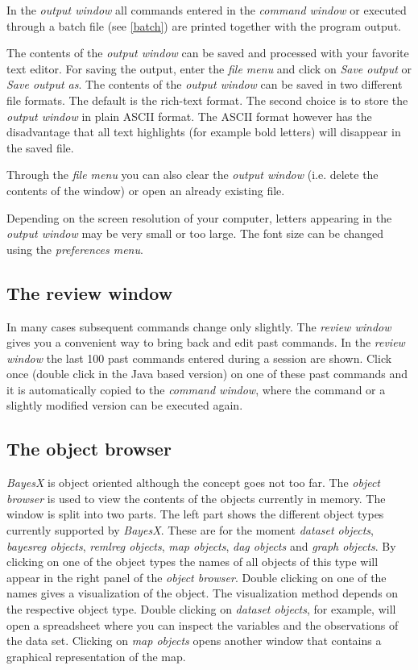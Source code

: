 In the {\em output window} all commands entered in the {\em
command window} or executed through a batch file (see
\autoref{batch}) are printed together with the program output.

 The contents of the {\em output window} can be
saved and processed with your favorite text editor. For saving the
output, enter the {\em file menu} and click on {\em Save output}
or {\em Save output as}. The contents of the {\em output window} can be
saved in two different file formats. The default is the rich-text
format. The second choice is to store the {\em output window} in plain
ASCII format. The ASCII format however has the disadvantage that
all text highlights (for example bold letters) will disappear in
the saved file.

Through the {\em file menu} you can also clear the {\em output window}
(i.e. delete the contents of the window) or open an already
existing file.

Depending on the screen resolution of your computer, letters
appearing in the {\em output window} may be very small or too large. The
font size can be changed  using the {\em preferences menu}.



\subsection{The review window}
 

In many cases subsequent commands change only slightly. The {\em
review window} gives you a convenient way to bring back and edit
past commands. In the {\em review window} the last 100 past
commands entered during a session are shown. Click once (double
click in the Java based version) on one of these past commands and
it is automatically copied to the {\em command window}, where the
command or a slightly modified version can be executed again.

\subsection{The object browser}

{\em BayesX} is object oriented although the concept goes not too
far. The {\em object browser} is used to view the contents of the
objects currently in memory. The window is split into two parts.
The left part shows the different object types currently supported
by {\em BayesX}. These are for the moment {\em dataset objects},
{\em bayesreg objects}, {\em remlreg objects}, {\em map objects},
{\em dag objects} and {\em graph objects}. By clicking on one of
the object types the names of all objects of this type will appear
in the right panel of the {\em object browser}. Double clicking on one
of the names gives a visualization of the object. The
visualization method depends on the respective object type. Double
clicking on {\em dataset objects}, for example, will open a
spreadsheet where you can inspect the variables and the
observations of the data set. Clicking on {\em map objects} opens
another window that contains a graphical representation of the
map.

